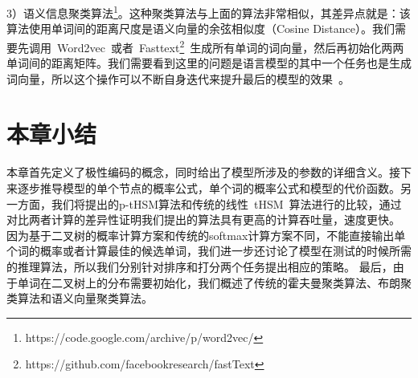 3）语义信息聚类算法\footnote{https://code.google.com/archive/p/word2vec/}。这种聚类算法与上面的算法非常相似，其差异点就是：该算法使用单词间的距离尺度是语义向量的余弦相似度（Cosine Distance）。我们需要先调用~Word2vec~或者~Fasttext\footnote{https://github.com/facebookresearch/fastText}~生成所有单词的词向量，然后再初始化两两单词间的距离矩阵。我们需要看到这里的问题是语言模型的其中一个任务也是生成词向量，所以这个操作可以不断自身迭代来提升最后的模型的效果~。


\section{本章小结}
本章首先定义了极性编码的概念，同时给出了模型所涉及的参数的详细含义。接下来逐步推导模型的单个节点的概率公式，单个词的概率公式和模型的代价函数。另一方面，我们将提出的p-tHSM算法和传统的线性~tHSM~算法进行的比较，通过对比两者计算的差异性证明我们提出的算法具有更高的计算吞吐量，速度更快。
因为基于二叉树的概率计算方案和传统的softmax计算方案不同，不能直接输出单个词的概率或者计算最佳的候选单词，我们进一步还讨论了模型在测试的时候所需的推理算法，所以我们分别针对排序和打分两个任务提出相应的策略。
最后，由于单词在二叉树上的分布需要初始化，我们概述了传统的霍夫曼聚类算法、布朗聚类算法和语义向量聚类算法。

